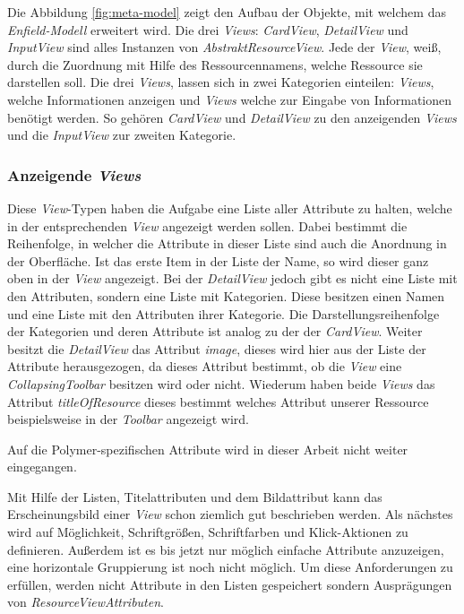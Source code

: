 Die Abbildung \ref{fig:meta-model} zeigt den Aufbau der Objekte, mit welchem das \textit{Enfield-Modell} erweitert wird. Die drei \textit{Views}: \textit{CardView}, \textit{DetailView} und \textit{InputView} sind alles Instanzen von \textit{AbstraktResourceView}. Jede der \textit{View}, weiß, durch die Zuordnung mit Hilfe des Ressourcennamens, welche Ressource sie darstellen soll. Die drei \textit{Views}, lassen sich in zwei Kategorien einteilen: \textit{Views}, welche Informationen anzeigen und \textit{Views} welche zur Eingabe von Informationen benötigt werden.
So gehören \textit{CardView} und \textit{DetailView} zu den anzeigenden \textit{Views} und die \textit{InputView} zur zweiten Kategorie. 

\subsubsection{Anzeigende \textit{Views}}
Diese \textit{View}-Typen haben die Aufgabe eine Liste aller Attribute zu halten, welche in der entsprechenden \textit{View} angezeigt werden sollen. Dabei bestimmt die Reihenfolge, in welcher die Attribute in dieser Liste sind auch die Anordnung in der Oberfläche. Ist das erste Item in der Liste der Name, so wird dieser ganz oben in der \textit{View} angezeigt.
Bei der \textit{DetailView} jedoch gibt es nicht eine Liste mit den Attributen, sondern eine Liste mit Kategorien. Diese besitzen 
einen Namen und eine Liste mit den Attributen ihrer Kategorie. Die Darstellungsreihenfolge der Kategorien und deren Attribute ist analog zu der der \textit{CardView}. Weiter besitzt die \textit{DetailView} das Attribut \textit{image}, dieses wird hier aus der Liste der Attribute herausgezogen, da dieses Attribut bestimmt, ob die \textit{View} eine \textit{CollapsingToolbar} besitzen wird oder nicht. Wiederum haben beide \textit{Views} das Attribut \textit{titleOfResource} dieses bestimmt welches Attribut unserer Ressource beispielsweise in der \textit{Toolbar} angezeigt wird.

Auf die Polymer-spezifischen Attribute wird in dieser Arbeit nicht weiter eingegangen.

Mit Hilfe der Listen, Titelattributen und dem Bildattribut kann das Erscheinungsbild einer \textit{View} schon ziemlich gut beschrieben werden. Als nächstes wird auf Möglichkeit, Schriftgrößen, Schriftfarben und Klick-Aktionen zu definieren.
Außerdem ist es bis jetzt nur möglich einfache Attribute anzuzeigen, eine horizontale Gruppierung ist noch nicht möglich. Um diese Anforderungen zu erfüllen, werden nicht Attribute in den Listen gespeichert sondern Ausprägungen von \textit{ResourceViewAttributen}. 

